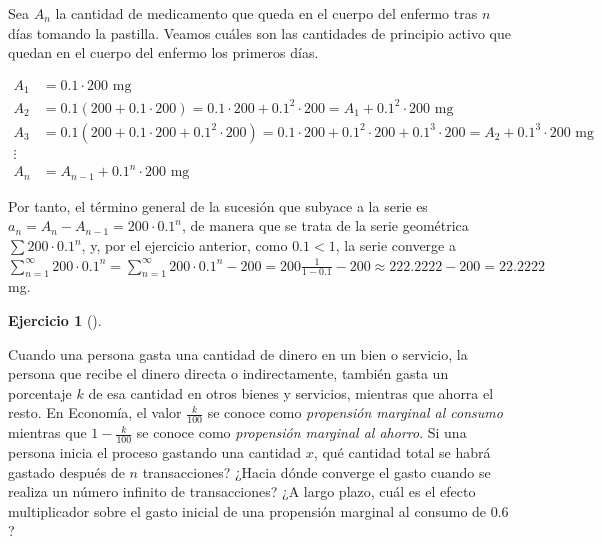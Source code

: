 \documentclass[
  a4paper,
]{scrreport}
\theoremstyle{definition}
\newtheorem{exercise}{Ejercicio}[chapter]
\theoremstyle{remark}
\begin{document}
\begin{tcolorbox}[enhanced jigsaw, left=2mm, coltitle=black, colbacktitle=quarto-callout-tip-color!10!white, opacitybacktitle=0.6, colback=white, breakable, titlerule=0mm, toptitle=1mm, rightrule=.15mm, bottomtitle=1mm, bottomrule=.15mm, toprule=.15mm, leftrule=.75mm, arc=.35mm, opacityback=0, title=\textcolor{quarto-callout-tip-color}{\faLightbulb}\hspace{0.5em}{Solución}, colframe=quarto-callout-tip-color-frame]

Sea \(A_n\) la cantidad de medicamento que queda en el cuerpo del
enfermo tras \(n\) días tomando la pastilla. Veamos cuáles son las
cantidades de principio activo que quedan en el cuerpo del enfermo los
primeros días.

\begin{align*}
A_1 &= 0.1\cdot 200 \mbox{ mg}\\ 
A_2 &= 0.1 (200 + 0.1\cdot 200) = 0.1\cdot 200 + 0.1^2 \cdot 200 = A_1 + 0.1^2\cdot 200 \mbox{ mg}\\ 
A_3 &= 0.1 (200 + 0.1\cdot 200 + 0.1^2 \cdot 200) = 0.1\cdot 200 + 0.1^2 \cdot 200 + 0.1^3\cdot 200 = A_2 + 0.1^3\cdot 200 \mbox{ mg}\\ 
\vdots\\
A_n &= A_{n-1} + 0.1^n \cdot 200 \mbox{ mg}
\end{align*}

Por tanto, el término general de la sucesión que subyace a la serie es
\(a_n = A_n-A_{n-1} = 200\cdot 0.1^n\), de manera que se trata de la
serie geométrica \(\sum 200\cdot 0.1^n\), y, por el ejercicio anterior,
como \(0.1<1\), la serie converge a
\(\sum_{n=1}^\infty 200\cdot 0.1^n = \sum_{n=1}^\infty 200\cdot 0.1^n - 200 = 200\frac{1}{1-0.1} - 200 \approx 222.2222 - 200 = 22.2222\)
mg.

\end{tcolorbox}

\begin{exercise}[]\protect\hypertarget{exr-propensiones-marginales-gasto-ahorro}{}\label{exr-propensiones-marginales-gasto-ahorro}

Cuando una persona gasta una cantidad de dinero en un bien o servicio,
la persona que recibe el dinero directa o indirectamente, también gasta
un porcentaje \(k\) de esa cantidad en otros bienes y servicios,
mientras que ahorra el resto. En Economía, el valor \(\frac{k}{100}\) se
conoce como \emph{propensión marginal al consumo} mientras que
\(1-\frac{k}{100}\) se conoce como \emph{propensión marginal al ahorro}.
Si una persona inicia el proceso gastando una cantidad \(x\), qué
cantidad total se habrá gastado después de \(n\) transacciones? ¿Hacia
dónde converge el gasto cuando se realiza un número infinito de
transacciones? ¿A largo plazo, cuál es el efecto multiplicador sobre el
gasto inicial de una propensión marginal al consumo de \(0.6\)?

\end{exercise}
\end{document}
